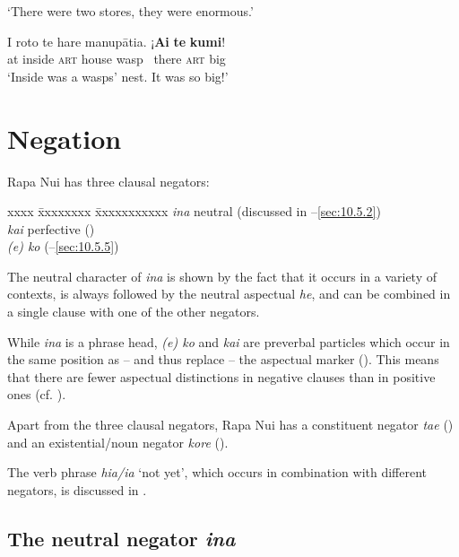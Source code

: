 \glt 
‘There were two stores, they were enormous.’ \textstyleExampleref{[R239.072]} 
\z

\ea\label{ex:10.87}
\gll {\ꞌ}I roto te hare manupātia. ¡\textbf{{\ꞌ}Ai} \textbf{te} \textbf{kumi}! \\
at inside \textsc{art} house wasp ~there \textsc{art} big \\

\glt 
‘Inside was a wasps’ nest. It was so big!’ \textstyleExampleref{[R133.004]}\textstyleExampleref{} 
\z
{}
\section{Negation}\label{sec:10.5}
Rapa Nui has three clausal negators:
\begin{tabbing}
xxxx \= xxxxxxxx \= xxxxxxxxxxx\kill
\> \textit{{\ꞌ}ina} \>    neutral (discussed in –\ref{sec:10.5.2})\\
\> \textit{kai}   \>  perfective ()\\
\> \textit{(e) ko}   \>   (–\ref{sec:10.5.5})
\end{tabbing}

The neutral character of \textit{{\ꞌ}ina} is shown by the fact that it occurs in a variety of contexts, is always followed by the neutral aspectual \textit{he}, and can be combined in a single clause with one of the other negators.

While \textit{{\ꞌ}ina} is a phrase head, \textit{(e) ko} and \textit{kai} are preverbal particles which occur in the same position as – and thus replace – the aspectual marker (). This means that there are fewer aspectual distinctions in negative clauses than in positive ones (cf. \citealt[129]{Dixon2012}).

Apart from the three clausal negators, Rapa Nui has a constituent negator \textit{\mbox{ta{\ꞌ}e}} () and an existential/noun negator \textit{kore} (). 

The verb phrase  \textit{hia/ia} ‘not yet’, which occurs in combination with different negators, is discussed in .

\subsection{The neutral negator \textit{{\ꞌ}ina}}\label{sec:10.5.1}

